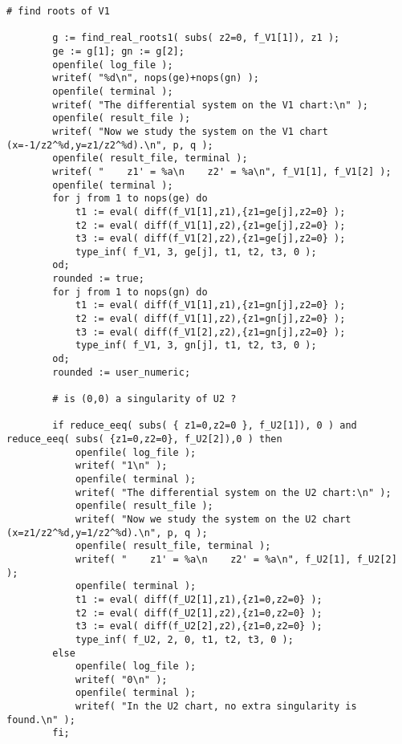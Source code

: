 \documentclass[a4paper,10pt]{article}
\begin{document}
\begin{lstlisting}[name=infinity]
        # find roots of V1

        g := find_real_roots1( subs( z2=0, f_V1[1]), z1 );
        ge := g[1]; gn := g[2];
        openfile( log_file );
        writef( "%d\n", nops(ge)+nops(gn) );
        openfile( terminal );
        writef( "The differential system on the V1 chart:\n" );
        openfile( result_file );
        writef( "Now we study the system on the V1 chart (x=-1/z2^%d,y=z1/z2^%d).\n", p, q );
        openfile( result_file, terminal );
        writef( "    z1' = %a\n    z2' = %a\n", f_V1[1], f_V1[2] );
        openfile( terminal );
        for j from 1 to nops(ge) do
            t1 := eval( diff(f_V1[1],z1),{z1=ge[j],z2=0} );
            t2 := eval( diff(f_V1[1],z2),{z1=ge[j],z2=0} );
            t3 := eval( diff(f_V1[2],z2),{z1=ge[j],z2=0} );
            type_inf( f_V1, 3, ge[j], t1, t2, t3, 0 );
        od;
        rounded := true;
        for j from 1 to nops(gn) do
            t1 := eval( diff(f_V1[1],z1),{z1=gn[j],z2=0} );
            t2 := eval( diff(f_V1[1],z2),{z1=gn[j],z2=0} );
            t3 := eval( diff(f_V1[2],z2),{z1=gn[j],z2=0} );
            type_inf( f_V1, 3, gn[j], t1, t2, t3, 0 );
        od;
        rounded := user_numeric;

        # is (0,0) a singularity of U2 ?

        if reduce_eeq( subs( { z1=0,z2=0 }, f_U2[1]), 0 ) and reduce_eeq( subs( {z1=0,z2=0}, f_U2[2]),0 ) then
            openfile( log_file );
            writef( "1\n" );
            openfile( terminal );
            writef( "The differential system on the U2 chart:\n" );
            openfile( result_file );
            writef( "Now we study the system on the U2 chart (x=z1/z2^%d,y=1/z2^%d).\n", p, q );
            openfile( result_file, terminal );
            writef( "    z1' = %a\n    z2' = %a\n", f_U2[1], f_U2[2] );
            openfile( terminal );
            t1 := eval( diff(f_U2[1],z1),{z1=0,z2=0} );
            t2 := eval( diff(f_U2[1],z2),{z1=0,z2=0} );
            t3 := eval( diff(f_U2[2],z2),{z1=0,z2=0} );
            type_inf( f_U2, 2, 0, t1, t2, t3, 0 );
        else
            openfile( log_file );
            writef( "0\n" );
            openfile( terminal );
            writef( "In the U2 chart, no extra singularity is found.\n" );
        fi;


\end{lstlisting}
\end{document}
